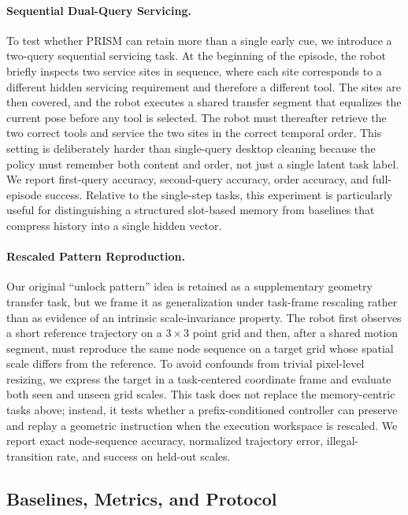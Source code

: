 \paragraph{Sequential Dual-Query Servicing.}
To test whether PRISM can retain more than a single early cue, we introduce a two-query sequential servicing task. At the beginning of the episode, the robot briefly inspects two service sites in sequence, where each site corresponds to a different hidden servicing requirement and therefore a different tool. The sites are then covered, and the robot executes a shared transfer segment that equalizes the current pose before any tool is selected. The robot must thereafter retrieve the two correct tools and service the two sites in the correct temporal order. This setting is deliberately harder than single-query desktop cleaning because the policy must remember both content and order, not just a single latent task label. We report first-query accuracy, second-query accuracy, order accuracy, and full-episode success. Relative to the single-step tasks, this experiment is particularly useful for distinguishing a structured slot-based memory from baselines that compress history into a single hidden vector.

\paragraph{Rescaled Pattern Reproduction.}
Our original ``unlock pattern'' idea is retained as a supplementary geometry transfer task, but we frame it as generalization under task-frame rescaling rather than as evidence of an intrinsic scale-invariance property. The robot first observes a short reference trajectory on a $3 \times 3$ point grid and then, after a shared motion segment, must reproduce the same node sequence on a target grid whose spatial scale differs from the reference. To avoid confounds from trivial pixel-level resizing, we express the target in a task-centered coordinate frame and evaluate both seen and unseen grid scales. This task does not replace the memory-centric tasks above; instead, it tests whether a prefix-conditioned controller can preserve and replay a geometric instruction when the execution workspace is rescaled. We report exact node-sequence accuracy, normalized trajectory error, illegal-transition rate, and success on held-out scales.

\subsection{Baselines, Metrics, and Protocol}
\label{sec:real_world_protocol}


